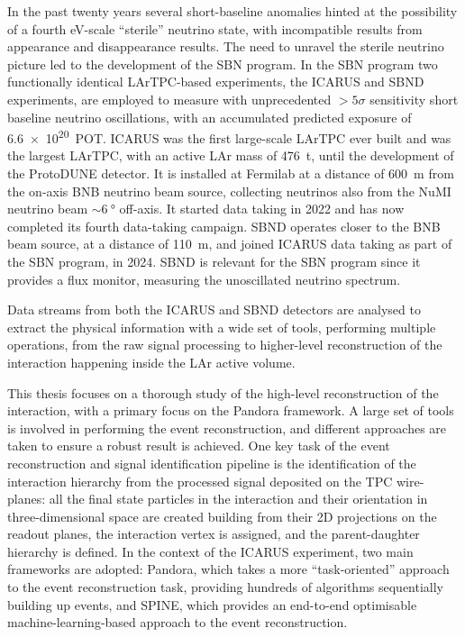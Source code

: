 
\label{chap:conclusions}

\vspace{1em}


In the past twenty years several short-baseline anomalies hinted at the possibility of a fourth eV-scale ``sterile'' neutrino state,  with incompatible results from appearance and disappearance results. The need to unravel the sterile neutrino picture led to the development of the SBN program. In the SBN program two functionally identical LArTPC-based experiments, the ICARUS and SBND experiments, are employed to measure with unprecedented ${>}5\sigma$ sensitivity short baseline neutrino oscillations, with an accumulated predicted exposure of \SI{6.6e20}{POT}. ICARUS was the first large-scale LArTPC ever built and was the largest LArTPC, with an active LAr mass of \SI{476}{\tonne}, until the development of the {ProtoDUNE} detector. It is installed at Fermilab at a distance of \SI{600}{\m} from the on-axis BNB neutrino beam source, collecting neutrinos also from the NuMI neutrino beam ${\sim}\SI{6}{\degree}$ off-axis. It started data taking in 2022 and has now completed its fourth data-taking campaign. SBND operates closer to the BNB beam source, at a distance of \SI{110}{\metre}, and joined ICARUS data taking as part of the SBN program, in 2024. SBND is relevant for the SBN program since it provides a flux monitor, measuring the unoscillated neutrino spectrum.

Data streams from both the ICARUS and SBND detectors are analysed to extract the physical information with a wide set of tools, performing multiple operations, from the raw signal processing to higher-level reconstruction of the interaction happening inside the LAr active volume. 

This thesis focuses on a thorough study of the high-level reconstruction of the interaction, with a primary focus on the Pandora framework. A large set of tools is involved in performing the event reconstruction, and different approaches are taken to ensure a robust result is achieved. One key task of the event reconstruction and signal identification pipeline is the identification of the interaction hierarchy from the processed signal deposited on the TPC wire-planes: all the final state particles in the interaction and their orientation in three-dimensional space are created building from their 2D projections on the readout planes, the interaction vertex is assigned, and the parent-daughter hierarchy is defined. 
In the context of the ICARUS experiment, two main frameworks are adopted: Pandora, which takes a more ``task-oriented'' approach to the event reconstruction task, providing hundreds of algorithms sequentially building up events, and SPINE, which provides an end-to-end optimisable machine-learning-based approach to the event reconstruction. 


